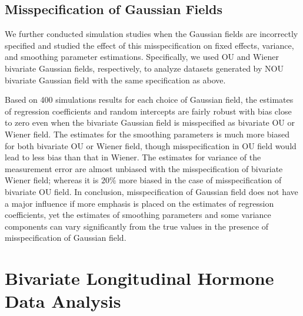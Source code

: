 \documentclass[article,lineno]{biometrika}
\begin{document}
\subsection{Misspecification of Gaussian Fields}

We further conducted simulation studies when the Gaussian fields are incorrectly specified and studied the effect of this misspecification on fixed effects, variance, and smoothing parameter estimations. Specifically, we used OU and Wiener bivariate Gaussian fields, respectively, to analyze datasets generated by NOU bivariate Gaussian field with the same specification as above.

Based on 400 simulations results for each choice of Gaussian field, the estimates of regression coefficients and random intercepts are fairly robust with bias close to zero even when the bivariate Gaussian field is misspecified as bivariate OU or Wiener field. The estimates for the smoothing parameters is much more biased for both bivariate OU or Wiener field, though misspecification in OU field would lead to less bias than that in Wiener. The estimates for variance of the measurement error are almost unbiased with the misspecification of bivariate Wiener field; whereas it is $20\%$ more biased in the case of misspecification of bivariate OU field. In conclusion, misspecification of Gaussian field does not  have a major influence if more emphasis is placed on the estimates of regression coefficients, yet the estimates of smoothing parameters and some variance components can vary significantly from the true values in the presence of misspecification of Gaussian field. 

%
%
%

\section{Bivariate Longitudinal Hormone Data Analysis} \label{dataAnalysis}
\end{document}
